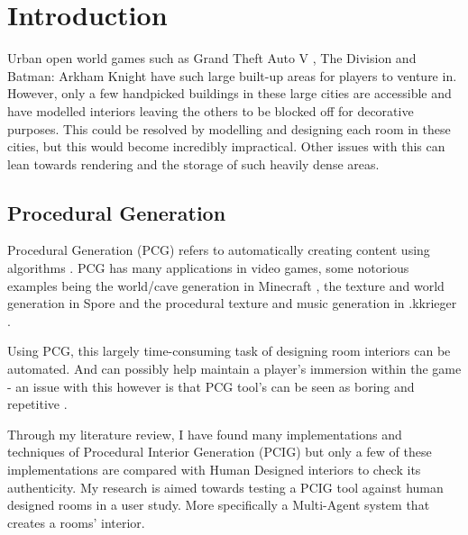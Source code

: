 \section{Introduction}
Urban open world games such as Grand Theft Auto V \cite{game:gta}, The Division \cite{game:division} and Batman: Arkham Knight \cite{game:arkham-knight} have such large built-up areas for players to venture in. However, only a few handpicked buildings in these large cities are accessible and have  modelled interiors leaving the others to be blocked off for decorative purposes. This could be resolved by modelling and designing each room in these cities, but this would become incredibly impractical. Other issues with this can lean towards rendering and the storage of such heavily dense areas.

\subsection*{Procedural Generation}
Procedural Generation (PCG) refers to automatically creating content using algorithms \cite{what-is-pcg}. PCG has many applications in video games, some notorious examples being the world/cave generation in Minecraft \cite{game:minecraft}, the texture\cite{game:spore-texture} and world generation\cite{game:spore-world} in Spore \cite{game:spore} and the procedural texture and music generation in .kkrieger \cite{game:kkreiger}.

Using PCG, this largely time-consuming task of designing room interiors can be automated. And can possibly help maintain a player's immersion within the game - an issue with this however is that PCG tool's can be seen as boring and repetitive \cite[Chapter~2]{pcg_in_gd}.

Through my literature review, I have found many implementations and techniques of Procedural Interior Generation (PCIG) but only a few of these implementations are compared with Human Designed interiors to check its authenticity. My research is aimed towards testing a PCIG tool against human designed rooms in a user study. More specifically a Multi-Agent system that creates a rooms' interior.

